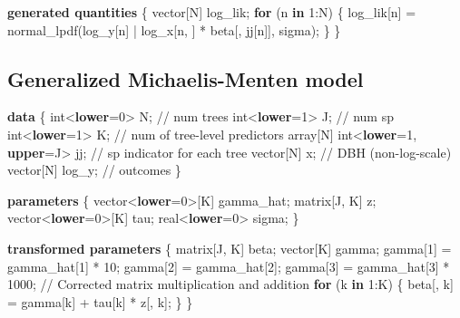 \documentclass[
  12pt,
  letterpaper,
  DIV=11,
  numbers=noendperiod]{scrartcl}
\newenvironment{Shaded}{\begin{snugshade}}{\end{snugshade}}
\newcommand{\CommentTok}[1]{\textcolor[rgb]{0.37,0.37,0.37}{#1}}
\newcommand{\ControlFlowTok}[1]{\textcolor[rgb]{0.00,0.23,0.31}{\textbf{#1}}}
\newcommand{\DataTypeTok}[1]{\textcolor[rgb]{0.68,0.00,0.00}{#1}}
\newcommand{\DecValTok}[1]{\textcolor[rgb]{0.68,0.00,0.00}{#1}}
\newcommand{\KeywordTok}[1]{\textcolor[rgb]{0.00,0.23,0.31}{\textbf{#1}}}
\newcommand{\NormalTok}[1]{\textcolor[rgb]{0.00,0.23,0.31}{#1}}
\begin{document}
\begin{Shaded}
\begin{Highlighting}[]
\KeywordTok{generated quantities}\NormalTok{ \{}
  \DataTypeTok{vector}\NormalTok{[N] log\_lik;}
  \ControlFlowTok{for}\NormalTok{ (n }\ControlFlowTok{in} \DecValTok{1}\NormalTok{:N) \{}
\NormalTok{    log\_lik[n] = normal\_lpdf(log\_y[n] | log\_x[n, ] * beta[, jj[n]], sigma);}
\NormalTok{  \}}
\NormalTok{\}}
\end{Highlighting}
\end{Shaded}

\newpage

\subsection{Generalized Michaelis-Menten
model}\label{generalized-michaelis-menten-model}

\begin{Shaded}
\begin{Highlighting}[]
\KeywordTok{data}\NormalTok{ \{}
  \DataTypeTok{int}\NormalTok{\textless{}}\KeywordTok{lower}\NormalTok{=}\DecValTok{0}\NormalTok{\textgreater{} N;                    }\CommentTok{// num trees}
  \DataTypeTok{int}\NormalTok{\textless{}}\KeywordTok{lower}\NormalTok{=}\DecValTok{1}\NormalTok{\textgreater{} J;                    }\CommentTok{// num sp}
  \DataTypeTok{int}\NormalTok{\textless{}}\KeywordTok{lower}\NormalTok{=}\DecValTok{1}\NormalTok{\textgreater{} K;                    }\CommentTok{// num of tree{-}level predictors}
  \DataTypeTok{array}\NormalTok{[N] }\DataTypeTok{int}\NormalTok{\textless{}}\KeywordTok{lower}\NormalTok{=}\DecValTok{1}\NormalTok{, }\KeywordTok{upper}\NormalTok{=J\textgreater{} jj; }\CommentTok{// sp indicator for each tree}
  \DataTypeTok{vector}\NormalTok{[N] x;                       }\CommentTok{// DBH (non{-}log{-}scale)}
  \DataTypeTok{vector}\NormalTok{[N] log\_y;                   }\CommentTok{// outcomes}
\NormalTok{\}}

\KeywordTok{parameters}\NormalTok{ \{}
  \DataTypeTok{vector}\NormalTok{\textless{}}\KeywordTok{lower}\NormalTok{=}\DecValTok{0}\NormalTok{\textgreater{}[K] gamma\_hat;}
  \DataTypeTok{matrix}\NormalTok{[J, K] z;}
  \DataTypeTok{vector}\NormalTok{\textless{}}\KeywordTok{lower}\NormalTok{=}\DecValTok{0}\NormalTok{\textgreater{}[K] tau;}
  \DataTypeTok{real}\NormalTok{\textless{}}\KeywordTok{lower}\NormalTok{=}\DecValTok{0}\NormalTok{\textgreater{} sigma;}
\NormalTok{\}}

\KeywordTok{transformed parameters}\NormalTok{ \{}
  \DataTypeTok{matrix}\NormalTok{[J, K] beta;}
  \DataTypeTok{vector}\NormalTok{[K] gamma;}
\NormalTok{  gamma[}\DecValTok{1}\NormalTok{] = gamma\_hat[}\DecValTok{1}\NormalTok{] * }\DecValTok{10}\NormalTok{;}
\NormalTok{  gamma[}\DecValTok{2}\NormalTok{] = gamma\_hat[}\DecValTok{2}\NormalTok{];}
\NormalTok{  gamma[}\DecValTok{3}\NormalTok{] = gamma\_hat[}\DecValTok{3}\NormalTok{] * }\DecValTok{1000}\NormalTok{;}
  \CommentTok{// Corrected matrix multiplication and addition}
  \ControlFlowTok{for}\NormalTok{ (k }\ControlFlowTok{in} \DecValTok{1}\NormalTok{:K) \{}
\NormalTok{    beta[, k] =  gamma[k] + tau[k] * z[, k];}
\NormalTok{  \}}
\NormalTok{\}}


\end{Highlighting}
\end{Shaded}
\end{document}
